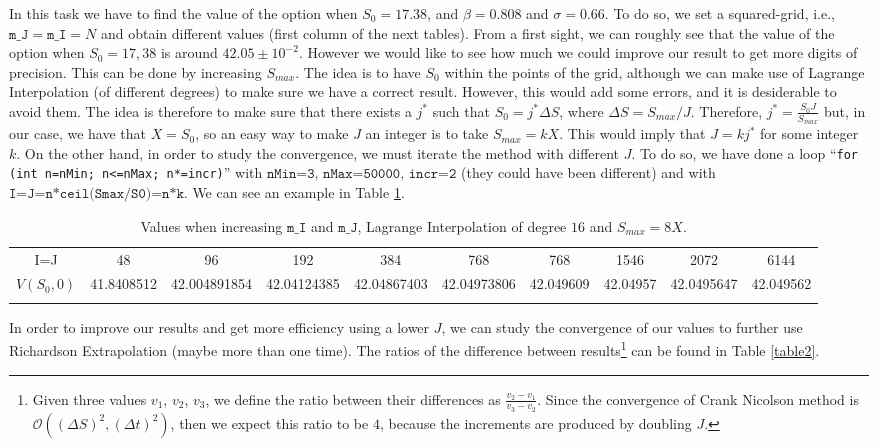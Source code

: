 In this task we have to find the value of the option when $S_0 = 17.38$, and $\beta = 0.808$ and $\sigma  = 0.66$. To do so, we set a squared-grid, i.e., $\texttt{m_J} = \texttt{m_I} = N$ and obtain different values (first column of the next tables). From a first sight, we can roughly see that the value of the option when $S_0 = 17,38$ is around $42.05\pm10^{-2}$. However we would like to see how much we could improve our result to get more digits of precision. This can be done by increasing $S_{max}$. The idea is to have $S_0$ within the points of the grid, although we can make use of Lagrange Interpolation (of different degrees) to make sure we have a correct result. However, this would add some errors, and it is desiderable to avoid them. The idea is therefore to make sure that there exists a $j^*$ such that $S_0 = j^* \Delta S$, where $\Delta S = S_{max} / J$. Therefore, $j^* = \frac{S_0 J}{S_{max}}$ but, in our case, we have that $X = S_0$, so an easy way to make $J$ an integer is to take $S_{max} = k X$. This would imply that $J =  k j^*$ for some integer $k$. On the other hand, in order to study the convergence, we must iterate the method with different $J$. To do so, we have done a loop ``\texttt{for (int n=nMin; n<=nMax; n*=incr)}'' with $\texttt{nMin=3, nMax=50000, incr=2}$ (they could have been different) and with $\texttt{I=J=n*ceil(Smax/S0)=n*k}$. We can see an example in Table \ref{table1}.

\begin{table}[h!]\scriptsize
	\setlength{\tabcolsep}{5pt}
	\renewcommand{\arraystretch}{1.3}
	\begin{tabular}{c|ccccccccc}
		\hline\addlinespace[0.1cm]
		I=J			& 48	& 96 & 192 & 384 & 768 & 768 & 1546 & 2072 & 6144 \\
		$V(S_0,0)$ & 41.8408512 & 42.004891854 & 42.04124385 & 42.04867403 & 42.04973806 & 42.049609 & 42.04957 & 42.0495647 & 42.049562 
       \\\addlinespace[0.1cm]
		\hline
	\end{tabular}
	\vspace{0.3cm}
	\captionsetup{width=.55\linewidth}
	\caption{Values when increasing $\texttt{m_I}$ and $\texttt{m_J}$, Lagrange Interpolation of degree $16$ and $S_{max} = 8X$.}\label{table1}
\end{table}
\vspace{-0.6cm}
In order to improve our results and get more efficiency using a lower $J$, we can study the convergence of our values to further use Richardson Extrapolation (maybe more than one time). The ratios of the difference between results\footnote{Given three values $v_1$, $v_2$, $v_3$, we define the ratio between their differences as $\frac{v_2-v_1}{v_3-v_2}$. Since the convergence of Crank Nicolson method is $\mathcal{O}((\Delta S)^2, (\Delta t)^2)$, then we expect this ratio to be $4$, because the increments are produced by doubling $J$.} can be found in Table \ref{table2}.

